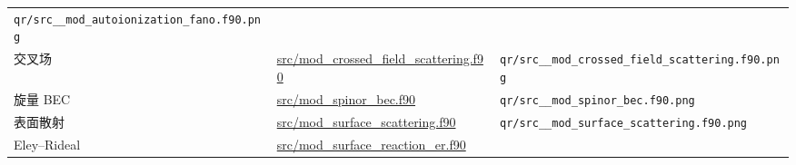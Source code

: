 \documentclass[
]{ctexbook}
\begin{document}
\begin{longtable}[]{@{}lll@{}}
\begin{minipage}[t]{0.30\columnwidth}
\texttt{qr/src\_\_mod\_autoionization\_fano.f90.png}\strut
\end{minipage}\tabularnewline
\begin{minipage}[t]{0.30\columnwidth}\raggedright
交叉场\strut
\end{minipage} & \begin{minipage}[t]{0.30\columnwidth}\raggedright
\href{https://github.com/l1Ha/QuantumGeneralModule/blob/main/src/mod_crossed_field_scattering.f90}{src/mod\_crossed\_field\_scattering.f90}\strut
\end{minipage} & \begin{minipage}[t]{0.30\columnwidth}\raggedright
\texttt{qr/src\_\_mod\_crossed\_field\_scattering.f90.png}\strut
\end{minipage}\tabularnewline
\begin{minipage}[t]{0.30\columnwidth}\raggedright
旋量 BEC\strut
\end{minipage} & \begin{minipage}[t]{0.30\columnwidth}\raggedright
\href{https://github.com/l1Ha/QuantumGeneralModule/blob/main/src/mod_spinor_bec.f90}{src/mod\_spinor\_bec.f90}\strut
\end{minipage} & \begin{minipage}[t]{0.30\columnwidth}\raggedright
\texttt{qr/src\_\_mod\_spinor\_bec.f90.png}\strut
\end{minipage}\tabularnewline
\begin{minipage}[t]{0.30\columnwidth}\raggedright
表面散射\strut
\end{minipage} & \begin{minipage}[t]{0.30\columnwidth}\raggedright
\href{https://github.com/l1Ha/QuantumGeneralModule/blob/main/src/mod_surface_scattering.f90}{src/mod\_surface\_scattering.f90}\strut
\end{minipage} & \begin{minipage}[t]{0.30\columnwidth}\raggedright
\texttt{qr/src\_\_mod\_surface\_scattering.f90.png}\strut
\end{minipage}\tabularnewline
\begin{minipage}[t]{0.30\columnwidth}\raggedright
Eley--Rideal\strut
\end{minipage} & \begin{minipage}[t]{0.30\columnwidth}\raggedright
\href{https://github.com/l1Ha/QuantumGeneralModule/blob/main/src/mod_surface_reaction_er.f90}{src/mod\_surface\_reaction\_er.f90}\strut
\end{minipage} & \begin{minipage}[t]{0.30\columnwidth}\raggedright

\end{minipage}
\end{longtable}
\end{document}
